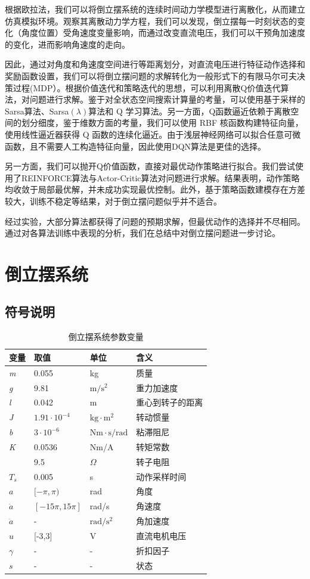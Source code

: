\documentclass[conference,10pt]{IEEEtran}
\begin{document}
根据欧拉法，我们可以将倒立摆系统的连续时间动力学模型进行离散化，从而建立仿真模拟环境。观察其离散动力学方程，我们可以发现，倒立摆每一时刻状态的变化（角度位置）受角速度变量影响，而通过改变直流电压，我们可以干预角加速度的变化，进而影响角速度的走向。

因此，通过对角度和角速度空间进行等距离划分，对直流电压进行特征动作选择和奖励函数设置，我们可以将倒立摆问题的求解转化为一般形式下的有限马尔可夫决策过程(MDP）。根据价值迭代和策略迭代的思想，可以利用离散Q价值迭代算法，对问题进行求解。鉴于对全状态空间搜索计算量的考量，可以使用基于采样的 Sarsa算法、Sarsa$(\lambda)$算法和 Q 学习算法。另一方面，Q函数逼近依赖于离散空间的划分细度，鉴于维数方面的考量，我们可以使用 RBF 核函数构建特征向量，使用线性逼近器获得 Q 函数的连续化逼近。由于浅层神经网络可以拟合任意可微函数，且不需要人工构造特征向量，因此使用DQN算法是更佳的选择。

另一方面，我们可以抛开Q价值函数，直接对最优动作策略进行拟合。我们尝试使用了REINFORCE算法与Actor-Critic算法对问题进行求解。结果表明，动作策略均收敛于局部最优解，并未成功实现最优控制。此外，基于策略函数建模存在方差较大，训练不稳定等结果，对于倒立摆问题似乎并不适合。

经过实验，大部分算法都获得了问题的预期求解，但最优动作的选择并不尽相同。通过对各算法训练中表现的分析，我们在总结中对倒立摆问题进一步讨论。
\section{倒立摆系统}
\subsection{符号说明}
\begin{table}[H]
	\centering
	\caption{倒立摆系统参数变量}
	\label{tb1}
	\begin{tabular}{llll}
		\hline
		变量&取值  &单位  &含义   \\ \hline
		\textit{m}& 0.055 & kg & 质量 \\ 
		\textit{g} & 9.81 & $\mathrm{m}/\mathrm{s}^2$ & 重力加速度  \\ 
		\textit{l} & 0.042 & m & 重心到转子的距离 \\ 
		\textit{J}&$1.91\cdot10^{-4}$  & $\mathrm{kg}\cdot\mathrm{m}^2$ &转动惯量  \\ 
		\textit{b}&$3\cdot10^{-6}$  &$\mathrm{Nm\cdot s/rad}$  & 粘滞阻尼 \\ 
		\textit{K}& 0.0536 & Nm/A & 转矩常数 \\
		\text{R}& 9.5 & $\Omega$ &转子电阻  \\
		$T_s$&0.005&s&动作采样时间\\
		$a$ & $[-\pi,\pi)$ &  rad & 角度  \\
		$\dot{a}$& $[-15\pi, 15\pi]$ & rad/s & 角速度  \\
		$\ddot{a}$& - & $\mathrm{rad/s^2}$ &   角加速度\\ 
		$u$&[-3,3]&V&直流电机电压\\
		$\gamma$&-&-&折扣因子\\
		$s$&-&-&状态\\ \hline
	\end{tabular}
\end{table}
\end{document}

